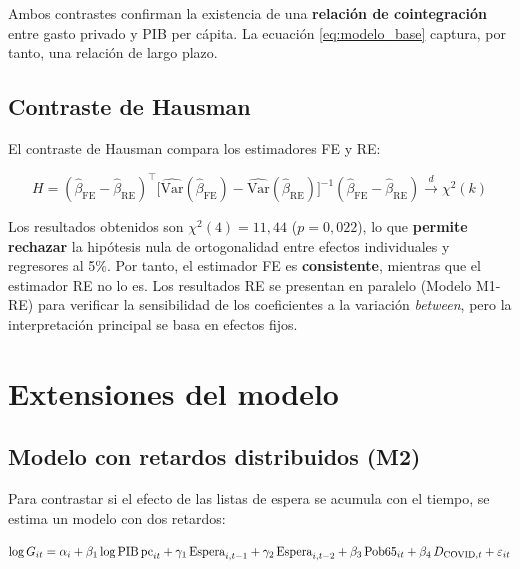 Ambos contrastes confirman la existencia de una \textbf{relación de
cointegración} entre gasto privado y PIB per cápita. La ecuación
\eqref{eq:modelo_base} captura, por tanto, una relación de largo plazo.

\subsection{Contraste de Hausman}
\label{sec:hausman}

El contraste de Hausman \parencite{Hausman1978} compara los estimadores FE y RE:

\begin{equation}
  H = (\hat{\beta}_{\text{FE}} - \hat{\beta}_{\text{RE}})^{\top}
      \bigl[\widehat{\text{Var}}(\hat{\beta}_{\text{FE}}) -
             \widehat{\text{Var}}(\hat{\beta}_{\text{RE}})\bigr]^{-1}
      (\hat{\beta}_{\text{FE}} - \hat{\beta}_{\text{RE}})
  \xrightarrow{d} \chi^2(k)
  \label{eq:hausman}
\end{equation}

Los resultados obtenidos son $\chi^2(4) = 11{,}44$ ($p = 0{,}022$), lo que
\textbf{permite rechazar} la hipótesis nula de ortogonalidad entre efectos
individuales y regresores al 5\%. Por tanto, el estimador FE es \textbf{consistente},
mientras que el estimador RE no lo es. Los resultados RE se presentan en
paralelo (Modelo M1-RE) para verificar la sensibilidad de los coeficientes a
la variación \textit{between}, pero la interpretación principal se basa en
efectos fijos.

\section{Extensiones del modelo}
\label{sec:extensiones}

\subsection{Modelo con retardos distribuidos (M2)}

Para contrastar si el efecto de las listas de espera se acumula con el tiempo,
se estima un modelo con dos retardos:

\begin{equation}
  \log G_{it} = \alpha_i + \beta_1 \log\text{PIB\,pc}_{it}
    + \gamma_1 \,\text{Espera}_{i,t-1}
    + \gamma_2 \,\text{Espera}_{i,t-2}
    + \beta_3 \,\text{Pob65}_{it}
    + \beta_4 \,D_{\text{COVID},t}
    + \varepsilon_{it}
  \label{eq:mod_lags}
\end{equation}

